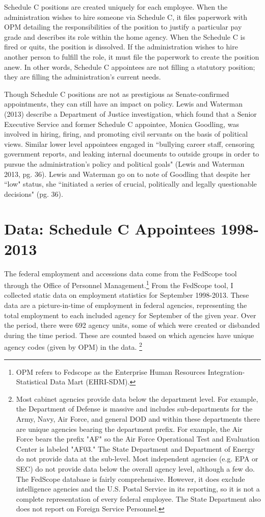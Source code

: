 \documentclass[12pt]{article}
\begin{document}
	Schedule C positions are created uniquely for each employee. When the administration wishes to hire someone via Schedule C, it files paperwork with OPM detailing the responsibilities of the position to justify a particular pay grade and describes its role within the home agency. When the Schedule C is fired or quits, the position is dissolved. If the administration wishes to hire another person to fulfill the role, it must file the paperwork to create the position anew. In other words, Schedule C appointees are not filling a statutory position; they are filling the administration's current needs.	
	
	Though Schedule C positions are not as prestigious as Senate-confirmed appointments, they can still have an impact on policy. Lewis and Waterman (2013) describe a Department of Justice investigation, which found that a Senior Executive Service and former Schedule C appointee, Monica Goodling, was involved in hiring, firing, and promoting civil servants on the basis of political views. Similar lower level appointees engaged in ``bullying career staff, censoring government reports, and leaking internal documents to outside groups in order to pursue the administration's policy and political goals" (Lewis and Waterman 2013, pg. 36). Lewis and Waterman go on to note of Goodling that despite her ``low" status, she ``initiated a series of crucial, politically and legally questionable decisions" (pg. 36). 
	
\section*{Data: Schedule C Appointees 1998-2013}

The federal employment and accessions data come from the FedScope tool through the Office of Personnel Management.\footnote{OPM refers to Fedscope as the Enterprise Human Resources Integration-Statistical Data Mart (EHRI-SDM).} From the FedScope tool, I collected static data on employment statistics for September 1998-2013. These data are a picture-in-time of employment in federal agencies, representing the total employment to each included agency for September of the given year. Over the period, there were 692 agency units, some of which were created or disbanded during the time period. These are counted based on which agencies have unique agency codes (given by OPM) in the data. \footnote{Most cabinet agencies provide data below the department level. For example, the Department of Defense is massive and includes sub-departments for the Army, Navy, Air Force, and general DOD and within these departments there are unique agencies bearing the department prefix. For example, the Air Force bears the prefix "AF" so the Air Force Operational Test and Evaluation Center is labeled "AF03." The State Department and Department of Energy do not provide data at the sub-level. Most independent agencies (e.g. EPA or SEC) do not provide data below the overall agency level, although a few do. The FedScope database is fairly comprehensive. However, it does exclude intelligence agencies and the U.S. Postal Service in its reporting, so it is not a complete representation of every federal employee. The State Department also does not report on Foreign Service Personnel.}
\end{document}
